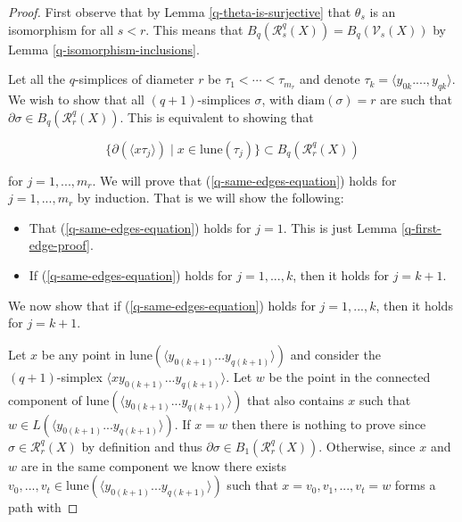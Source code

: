 \documentclass[10pt,a4paper]{amsart}
\newcommand\Vr{\mathcal{V}}
\newcommand\diam{\mathrm{diam}}
\newcommand\lune{\mathrm{lune}}
\newcommand\rvr{\mathcal{R}}
\begin{document}
\begin{proof}
    First observe that by Lemma \ref{q-theta-is-surjective} that $\theta_s$ is an isomorphism for all $s < r$. This means that $B_{q}(\rvr_{s}^{q}(X)) = B_{q}(\Vr_{s}(X))$ by Lemma \ref{q-isomorphism-inclusions}. 
    
    Let all the $q$-simplices of diameter $r$ be $ \tau_{1}  < \cdots <  \tau_{m_{r}} $ and denote $\tau_{k} = \langle y_{0k}....,y_{qk} \rangle$. We wish to show that all $(q+1)$-simplices $\sigma$, with $\diam(\sigma) = r$ are such that $\partial \sigma \in B_{q}(\rvr_{r}^{q}(X))$. This is equivalent to showing that 

    \begin{equation}
    \label{q-same-edges-equation}
         \{ \partial ( \langle  x \tau_{j} \rangle)\; | \; x\in \lune (\tau_{j}) \} \subset B_{q}(\rvr_{r}^{q}(X))
    \end{equation}

for $j = 1,...,m_{r}$. We will prove that (\ref{q-same-edges-equation}) holds for $j = 1,...,m_{r}$ by induction. That is we will show the following:

\begin{itemize}
    \item That (\ref{q-same-edges-equation}) holds for $j=1$. This is just Lemma \ref{q-first-edge-proof}. 

    \item If (\ref{q-same-edges-equation}) holds for $j=1,...,k$, then it holds for $j = k+1$. 
\end{itemize}



We now show that if (\ref{q-same-edges-equation}) holds for $j = 1,...,k$, then it holds for $j = k+1$. 

Let $x$ be any point in $\lune (\langle y_{0 (k+1)}...y_{q (k+1)} \rangle)$ and consider the \\ $(q+1)$-simplex $\langle x y_{0(k+1)}...y_{q(k+1)} \rangle$. Let $w$ be the point in the connected component of $\lune (\langle y_{0(k+1)}...y_{q(k+1)} \rangle)$ that also contains $x$ such that $w\in L(\langle y_{0(k+1)}...y_{q(k+1)}\rangle)$. If $x=w$ then there is nothing to prove since $\sigma \in \rvr^{q}_{r}(X)$ by definition and thus $\partial \sigma \in B_{1}(\rvr_{r}^{q}(X))$. Otherwise, since $x$ and $w$ are in the same component we know there exists $v_{0},...,v_{t} \in \lune (\langle y_{0(k+1)}...y_{q(k+1)} \rangle)$ such that $x = v_0, v_1, ..., v_t = w$ forms a path with


\end{proof}
\end{document}
